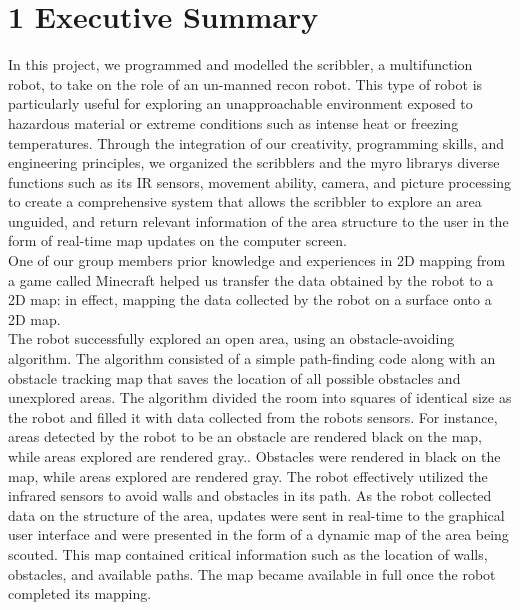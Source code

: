 \documentclass[12pt]{article}
\begin{document}
\section*{\fontsize{16}{16}\textsf{1 Executive Summary}}
\onehalfspacing

In this project, we programmed and modelled the scribbler, a multifunction robot, to take on the role of an un-manned recon robot. This type of robot is particularly useful for exploring an unapproachable environment exposed to hazardous material or extreme conditions such as intense heat or freezing temperatures. Through the integration of our creativity, programming skills, and engineering principles, we organized the scribblers and the myro librarys diverse functions such as its IR sensors, movement ability, camera, and picture processing\cite{parallax} to create a comprehensive system that allows the scribbler to explore an area unguided, and return relevant information of the area structure to the user in the form of real-time map updates on the computer screen.\\

One of our group members prior knowledge and experiences in 2D mapping from a game called Minecraft helped us transfer the data obtained by the robot to a 2D map: in effect, mapping the data collected by the robot on a surface onto a 2D map.\\

The robot successfully explored an open area, using an obstacle-avoiding algorithm. The algorithm consisted of a simple path-finding code along with an obstacle tracking map that saves the location of all possible obstacles and unexplored areas. The algorithm divided the room into squares of identical size as the robot and filled it with data collected from the robots sensors. For instance, areas detected by the robot to be an obstacle are rendered black on the map, while areas explored are rendered gray.. Obstacles were rendered in black on the map, while areas explored are rendered gray. The robot effectively utilized the infrared sensors to avoid walls and obstacles in its path. As the robot collected data on the structure of the area, updates were sent in real-time to the graphical user interface and were presented in the form of a dynamic map of the area being scouted. This map contained critical information such as the location of walls, obstacles, and available paths. The map became available in full once the robot completed its mapping.\\
\end{document}
